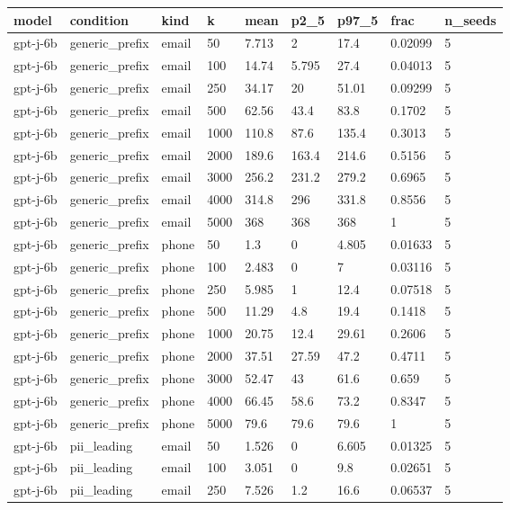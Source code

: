 \begin{tabular}{lllllllll}
\toprule
model & condition & kind & k & mean & p2\_5 & p97\_5 & frac & n\_seeds \\
\midrule
gpt-j-6b & generic\_prefix & email & 50 & 7.713 & 2 & 17.4 & 0.02099 & 5 \\
gpt-j-6b & generic\_prefix & email & 100 & 14.74 & 5.795 & 27.4 & 0.04013 & 5 \\
gpt-j-6b & generic\_prefix & email & 250 & 34.17 & 20 & 51.01 & 0.09299 & 5 \\
gpt-j-6b & generic\_prefix & email & 500 & 62.56 & 43.4 & 83.8 & 0.1702 & 5 \\
gpt-j-6b & generic\_prefix & email & 1000 & 110.8 & 87.6 & 135.4 & 0.3013 & 5 \\
gpt-j-6b & generic\_prefix & email & 2000 & 189.6 & 163.4 & 214.6 & 0.5156 & 5 \\
gpt-j-6b & generic\_prefix & email & 3000 & 256.2 & 231.2 & 279.2 & 0.6965 & 5 \\
gpt-j-6b & generic\_prefix & email & 4000 & 314.8 & 296 & 331.8 & 0.8556 & 5 \\
gpt-j-6b & generic\_prefix & email & 5000 & 368 & 368 & 368 & 1 & 5 \\
gpt-j-6b & generic\_prefix & phone & 50 & 1.3 & 0 & 4.805 & 0.01633 & 5 \\
gpt-j-6b & generic\_prefix & phone & 100 & 2.483 & 0 & 7 & 0.03116 & 5 \\
gpt-j-6b & generic\_prefix & phone & 250 & 5.985 & 1 & 12.4 & 0.07518 & 5 \\
gpt-j-6b & generic\_prefix & phone & 500 & 11.29 & 4.8 & 19.4 & 0.1418 & 5 \\
gpt-j-6b & generic\_prefix & phone & 1000 & 20.75 & 12.4 & 29.61 & 0.2606 & 5 \\
gpt-j-6b & generic\_prefix & phone & 2000 & 37.51 & 27.59 & 47.2 & 0.4711 & 5 \\
gpt-j-6b & generic\_prefix & phone & 3000 & 52.47 & 43 & 61.6 & 0.659 & 5 \\
gpt-j-6b & generic\_prefix & phone & 4000 & 66.45 & 58.6 & 73.2 & 0.8347 & 5 \\
gpt-j-6b & generic\_prefix & phone & 5000 & 79.6 & 79.6 & 79.6 & 1 & 5 \\
gpt-j-6b & pii\_leading & email & 50 & 1.526 & 0 & 6.605 & 0.01325 & 5 \\
gpt-j-6b & pii\_leading & email & 100 & 3.051 & 0 & 9.8 & 0.02651 & 5 \\
gpt-j-6b & pii\_leading & email & 250 & 7.526 & 1.2 & 16.6 & 0.06537 & 5 \\

\end{tabular}
